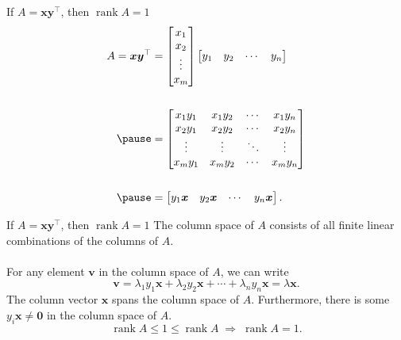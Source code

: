 \documentclass{beamer}
\def\x{\bm{x}}
\def\y{\bm{y}}
\def\v{\bm{v}}
\def\xcol{\begin{bmatrix} x_1 \\ x_2 \\ \vdots \\ x_m \end{bmatrix} }
\def\yrow{\begin{bmatrix} y_1 & y_2 & \cdots & y_n \end{bmatrix} }
\def\rank{\operatorname{rank}}
\begin{document}
        \begin{frame}{If $A = \x\y^\top$, then $\rank{A} = 1$}
                \begin{align*}
                        A = \x\y^\top &= \xcol\yrow \\ \\ \pause
                                &= \begin{bmatrix}
                                        x_1y_1 & x_1y_2 & \cdots & x_1y_n \\
                                        x_2y_1 & x_2y_2 & \cdots & x_2y_n \\
                                        \vdots & \vdots & \ddots & \vdots \\
                                        x_my_1 & x_my_2 & \cdots & x_my_n \\
                                \end{bmatrix} \\ \\ \pause
                                &= \begin{bmatrix}
                                        y_1\x & y_2\x & \cdots & y_n\x
                                \end{bmatrix}.
                \end{align*}        
        \end{frame}
        
        \begin{frame}{If $A = \x\y^\top$, then $\rank{A} = 1$}
        The column space of $A$ consists of all finite linear combinations of the columns of $A$. \\~\\
        \pause
        For any element $\v$ in the column space of $A$, we can write
        \[
                \v = \lambda_1y_1\x + \lambda_2y_2\x + \cdots + \lambda_ny_n\x = \lambda \x.
        \]
        \pause
        The column vector $\x$ spans the column space of $A$. 
        Furthermore, there is some $y_i\x\neq\mathbf{0}$ in the column space of $A$. 
        \[
                \rank{A} \leq 1 \leq \rank{A} \;\Rightarrow\; \rank{A} = 1.
        \]
        \end{frame}
        
\end{document}
